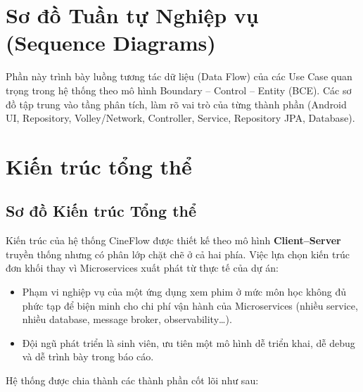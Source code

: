 \section{Sơ đồ Tuần tự Nghiệp vụ (Sequence Diagrams)}
\label{sec:sequence_diagrams}
Phần này trình bày luồng tương tác dữ liệu (Data Flow) của các Use Case quan trọng
trong hệ thống theo mô hình Boundary -- Control -- Entity (BCE). Các sơ đồ tập trung vào tầng phân tích, làm rõ vai trò của từng thành phần (Android UI, Repository, Volley/Network, Controller, Service, Repository JPA, Database).




\section{Kiến trúc tổng thể}
\label{sec:kien_truc}

\subsection{Sơ đồ Kiến trúc Tổng thể}
\label{subsec:so_do_kien_truc}

Kiến trúc của hệ thống CineFlow được thiết kế theo mô hình \textbf{Client--Server}
truyền thống nhưng có phân lớp chặt chẽ ở cả hai phía. Việc lựa chọn kiến trúc đơn
khối thay vì Microservices xuất phát từ thực tế của dự án:
\begin{itemize}
  \item Phạm vi nghiệp vụ của một ứng dụng xem phim ở mức môn học không đủ phức tạp
  để biện minh cho chi phí vận hành của Microservices (nhiều service, nhiều database,
  message broker, observability\dots).
  \item Đội ngũ phát triển là sinh viên, ưu tiên một mô hình dễ triển khai, dễ debug
  và dễ trình bày trong báo cáo.
\end{itemize}

Hệ thống được chia thành các thành phần cốt lõi như sau:

